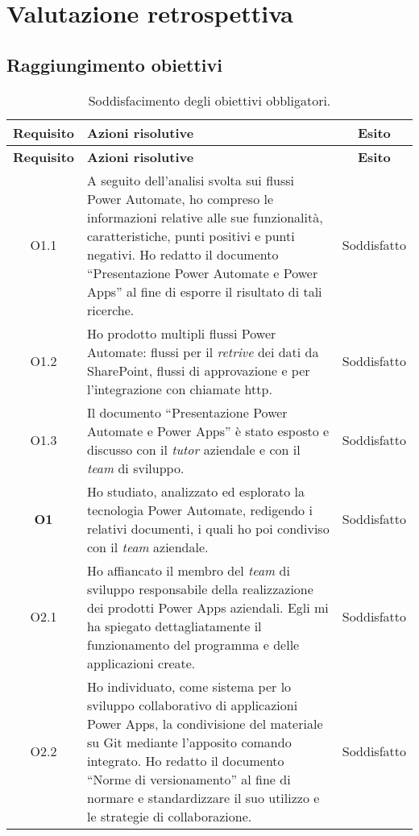 \chapter{Valutazione retrospettiva}
\label{cap:valutazioneRetrospettiva}

\section{Raggiungimento obiettivi}
\begingroup
\renewcommand\arraystretch{1.3}
\begin{longtable}{|c|p{8cm}|c|}
    \caption{Soddisfacimento degli obiettivi obbligatori.}
    \label{tab:soddObbObbligatori}\\
    \hline \textbf{Requisito} & \textbf{Azioni risolutive} & \textbf{Esito}\\ \endfirsthead
    \hline \textbf{Requisito} & \textbf{Azioni risolutive} & \textbf{Esito}\\ \endhead
    \hline \endfoot
    \hline \endlastfoot
    \hline O1.1  & A seguito dell'analisi svolta sui flussi Power Automate, ho compreso le informazioni relative alle sue funzionalità, caratteristiche, punti positivi e punti negativi. Ho redatto il documento “Presentazione Power Automate e Power Apps” al fine di esporre il risultato di tali ricerche. & Soddisfatto\\
    \hline O1.2  & Ho prodotto multipli flussi Power Automate: flussi per il \emph{retrive} dei dati da SharePoint, flussi di approvazione e per l'integrazione con chiamate \gls{http}. & Soddisfatto\\
    \hline O1.3  & Il documento “Presentazione Power Automate e Power Apps” è stato esposto e discusso con il \emph{tutor} aziendale e con il \emph{team} di sviluppo. & Soddisfatto\\
    \hline \textbf{O1}    & Ho studiato, analizzato ed esplorato la tecnologia Power Automate, redigendo i relativi documenti, i quali ho poi condiviso con il \emph{team} aziendale. & Soddisfatto\\
    \hline O2.1  & Ho affiancato il membro del \emph{team} di sviluppo responsabile della realizzazione dei prodotti Power Apps aziendali. Egli mi ha spiegato dettagliatamente il funzionamento del programma e delle applicazioni create. & Soddisfatto\\
    \hline O2.2  & Ho individuato, come sistema per lo sviluppo collaborativo di applicazioni Power Apps, la condivisione del materiale su Git mediante l'apposito comando integrato. Ho redatto il documento “Norme di versionamento” al fine di normare e standardizzare il suo utilizzo e le strategie di collaborazione. & Soddisfatto\\

\end{longtable}
